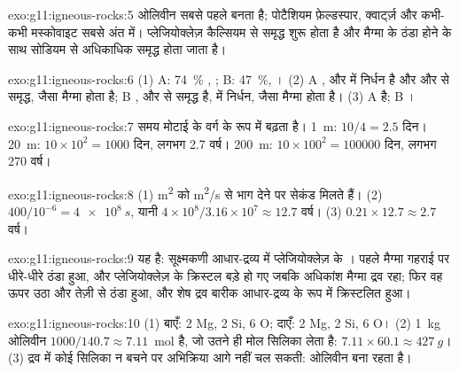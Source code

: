 \begin{solution}{exo:g11:igneous-rocks:5}
ओलिवीन सबसे पहले बनता है; पोटैशियम फ़ेल्डस्पार, क्वार्ट्ज़ और कभी-कभी मस्कोवाइट
सबसे अंत में। प्लेजियोक्लेज़ कैल्सियम से समृद्ध शुरू होता है और मैग्मा के ठंडा होने के साथ
सोडियम से अधिकाधिक समृद्ध होता जाता है।
\end{solution}

\begin{solution}{exo:g11:igneous-rocks:6}
(1) A: \qty{74}{\percent} , ; B: \qty{47}{\percent}, ।
(2) A ,  और  में निर्धन है और  और
 से समृद्ध, जैसा  मैग्मा होता है; B ,  और  से समृद्ध है,
 में निर्धन, जैसा  मैग्मा होता है। (3) A  है; B ।
\end{solution}

\begin{solution}{exo:g11:igneous-rocks:7}
समय मोटाई के वर्ग के रूप में बढ़ता है। \qty{1}{m}: $10/4 = 2.5$
दिन। \qty{20}{m}: $10 \times 10^2 = 1000$ दिन, लगभग 2.7 वर्ष।
\qty{200}{m}: $10 \times 100^2 = \num{100000}$ दिन, लगभग 270 वर्ष।
\end{solution}

\begin{solution}{exo:g11:igneous-rocks:8}
(1) \unit{m^2} को \unit{m^2/s} से भाग देने पर सेकंड मिलते हैं। (2) $400/10^{-6} =
\qty{4e8}{s}$, यानी $4 \times 10^8 / 3.16 \times 10^7 \approx 12.7$
वर्ष। (3) $0.21 \times 12.7 \approx 2.7$ वर्ष।
\end{solution}

\begin{solution}{exo:g11:igneous-rocks:9}
यह  है: सूक्ष्मकणी आधार-द्रव्य में प्लेजियोक्लेज़ के ।
पहले मैग्मा गहराई पर धीरे-धीरे ठंडा हुआ, और प्लेजियोक्लेज़ के क्रिस्टल
बड़े हो गए जबकि अधिकांश मैग्मा द्रव रहा; फिर वह ऊपर उठा और तेज़ी से ठंडा हुआ,
और शेष द्रव बारीक आधार-द्रव्य के रूप में क्रिस्टलित हुआ।
\end{solution}

\begin{solution}{exo:g11:igneous-rocks:10}
(1) बाएँ: 2 Mg, 2 Si, 6 O; दाएँ: 2 Mg, 2 Si, 6 O। (2) \qty{1}{kg}
ओलिवीन $1000/140.7 \approx 7.11$~mol है, जो उतने ही मोल
सिलिका लेता है: $7.11 \times 60.1 \approx \qty{427}{g}$। (3) द्रव में कोई सिलिका न बचने पर
अभिक्रिया आगे नहीं चल सकती: ओलिवीन बना रहता है।
\end{solution}

